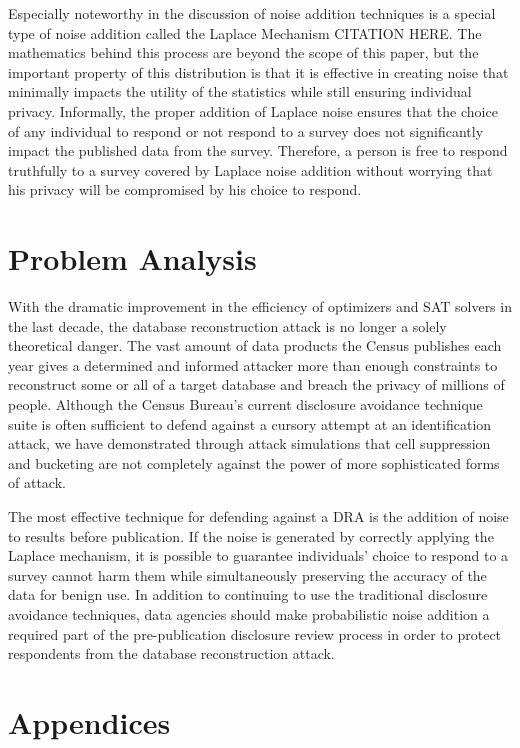 \documentclass[jou,apacite]{apa6}
\begin{document}
Especially noteworthy in the discussion of noise addition techniques is a special type of noise addition called the Laplace Mechanism CITATION HERE.
The mathematics behind this process are beyond the scope of this paper, but the important property of this distribution is that it is effective in creating noise that minimally impacts the utility of the statistics while still ensuring individual privacy. Informally, the proper addition of Laplace noise ensures that the choice of any individual to respond or not respond to a survey does not significantly impact the published data from the survey. Therefore, a person is free to respond truthfully to a survey covered by Laplace noise addition without worrying that his privacy will be compromised by his choice to respond.

\section{Problem Analysis}

With the dramatic improvement in the efficiency of optimizers and SAT solvers in the last decade, the database reconstruction attack is no longer a solely theoretical danger. The vast amount of data products the Census publishes each year gives a determined and informed attacker more than enough constraints to reconstruct some or all of a target database and breach the privacy of millions of people. Although the Census Bureau's current disclosure avoidance technique suite is often sufficient to defend against a cursory attempt at an identification attack, we have demonstrated through attack simulations that cell suppression and bucketing are not completely against the power of more sophisticated forms of attack.

The most effective technique for defending against a DRA is the addition of noise to results before publication. If the noise is generated by correctly applying the Laplace mechanism, it is possible to guarantee individuals' choice to respond to a survey cannot harm them while simultaneously preserving the accuracy of the data for benign use. In addition to continuing to use the traditional disclosure avoidance techniques, data agencies should make probabilistic noise addition a required part of the pre-publication disclosure review process in order to protect respondents from the database reconstruction attack.

\section{Appendices}
\end{document}
